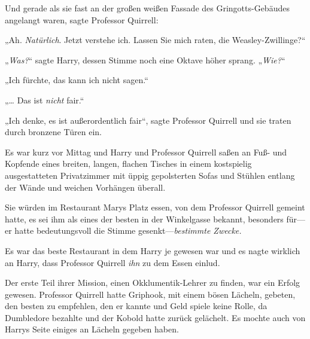 Und gerade als sie fast an der großen weißen Fassade des Gringotts-Gebäudes angelangt waren, sagte Professor Quirrell:

„Ah. \emph{Natürlich}. Jetzt verstehe ich. Lassen Sie mich raten, die Weasley-Zwillinge?“

„\emph{Was?}“ sagte Harry, dessen Stimme noch eine Oktave höher sprang. „\emph{Wie?}“

„Ich fürchte, das kann ich nicht sagen.“

„… Das ist \emph{nicht} fair.“

„Ich denke, es ist außerordentlich fair“, sagte Professor Quirrell und sie traten durch bronzene Türen ein.

\later

Es war kurz vor Mittag und Harry und Professor Quirrell saßen an Fuß- und Kopfende eines breiten, langen, flachen Tisches in einem kostspielig ausgestatteten Privatzimmer mit üppig gepolsterten Sofas und Stühlen entlang der Wände und weichen Vorhängen überall.

Sie würden im Restaurant Marys Platz essen, von dem Professor Quirrell gemeint hatte, es sei ihm als eines der besten in der Winkelgasse bekannt, besonders für—er hatte bedeutungsvoll die Stimme gesenkt—\emph{bestimmte Zwecke.}

Es war das beste Restaurant in dem Harry je gewesen war und es nagte wirklich an Harry, dass Professor Quirrell \emph{ihn} zu dem Essen einlud.

Der erste Teil ihrer Mission, einen Okklumentik-Lehrer zu finden, war ein Erfolg gewesen. Professor Quirrell hatte Griphook, mit einem bösen Lächeln, gebeten, den besten zu empfehlen, den er kannte und Geld spiele keine Rolle, da Dumbledore bezahlte und der Kobold hatte zurück gelächelt. Es mochte auch von Harrys Seite einiges an Lächeln gegeben haben.

